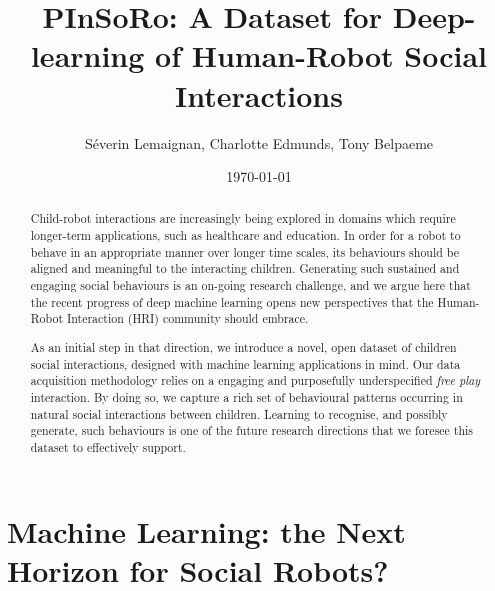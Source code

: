 \documentclass{article}
\title{PInSoRo: A Dataset for Deep-learning of Human-Robot Social Interactions}
\author{Séverin Lemaignan, Charlotte Edmunds, Tony Belpaeme}
\date{\today}
\begin{document}
\maketitle

\begin{abstract}


Child-robot interactions are increasingly being explored in domains which
require longer-term applications, such as healthcare and education. In order
for a robot to behave in an appropriate manner over longer time scales, its
behaviours should be aligned and meaningful to the interacting children.
Generating such sustained and engaging social behaviours is an on-going research
challenge, and we argue here that the recent progress of deep machine learning
opens new perspectives that the Human-Robot Interaction (HRI) community
should embrace.

As an initial step in that direction, we introduce a novel,
open dataset of children social interactions, designed with
machine learning applications in mind. Our data acquisition methodology relies on
a engaging and purposefully underspecified \emph{free play} interaction. By doing
so, we capture a rich set of behavioural patterns occurring in natural
social interactions between children. Learning to recognise, and possibly generate, such
behaviours is one of the future research directions that we foresee this dataset to effectively support.


\end{abstract}

\section{Machine Learning: the Next Horizon for Social Robots?}
\end{document}
